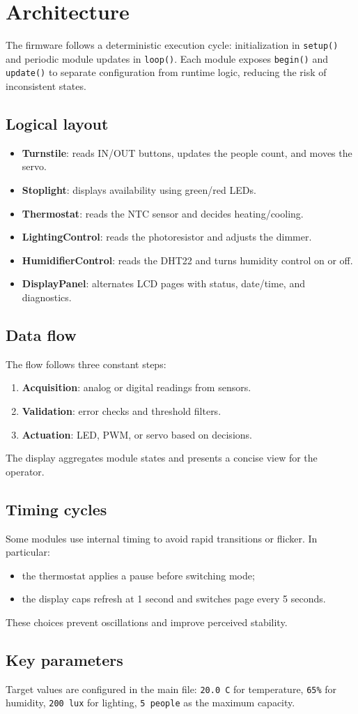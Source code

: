 \chapter{Architecture}

The firmware follows a deterministic execution cycle: initialization in \texttt{setup()} and periodic module updates in \texttt{loop()}. Each module exposes \texttt{begin()} and \texttt{update()} to separate configuration from runtime logic, reducing the risk of inconsistent states.

\section{Logical layout}
\begin{itemize}
  \item \textbf{Turnstile}: reads IN/OUT buttons, updates the people count, and moves the servo.
  \item \textbf{Stoplight}: displays availability using green/red LEDs.
  \item \textbf{Thermostat}: reads the NTC sensor and decides heating/cooling.
  \item \textbf{LightingControl}: reads the photoresistor and adjusts the dimmer.
  \item \textbf{HumidifierControl}: reads the DHT22 and turns humidity control on or off.
  \item \textbf{DisplayPanel}: alternates LCD pages with status, date/time, and diagnostics.
\end{itemize}

\section{Data flow}
The flow follows three constant steps:
\begin{enumerate}
  \item \textbf{Acquisition}: analog or digital readings from sensors.
  \item \textbf{Validation}: error checks and threshold filters.
  \item \textbf{Actuation}: LED, PWM, or servo based on decisions.
\end{enumerate}
The display aggregates module states and presents a concise view for the operator.

\section{Timing cycles}
Some modules use internal timing to avoid rapid transitions or flicker. In particular:
\begin{itemize}
  \item the thermostat applies a pause before switching mode;
  \item the display caps refresh at 1 second and switches page every 5 seconds.
\end{itemize}
These choices prevent oscillations and improve perceived stability.

\section{Key parameters}
Target values are configured in the main file:\newline
\texttt{20.0 C} for temperature, \texttt{65\%} for humidity, \texttt{200 lux} for lighting, \texttt{5 people} as the maximum capacity.
